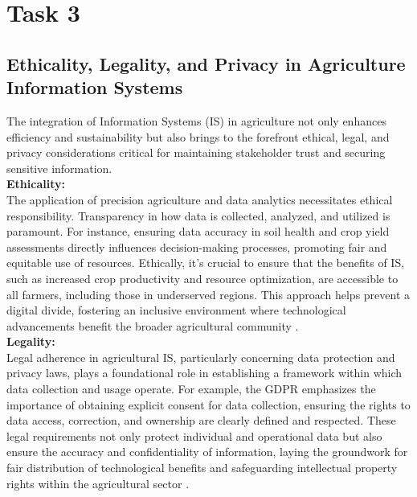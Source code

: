 \documentclass[12pt,a4paper]{article}
\begin{document}
\pagebreak

\setcounter{page}{5}

\section{Task 3}
\subsection{Ethicality, Legality, and Privacy in Agriculture Information Systems}
\label{sec:Task 3}
\nocite{question_3.A}

\noindent The integration of Information Systems (IS) in agriculture not only enhances efficiency and sustainability but also brings to the forefront ethical, legal, and privacy considerations critical for maintaining stakeholder trust and securing sensitive information.\\


\noindent \textbf{Ethicality:} \\The application of precision agriculture and data analytics necessitates ethical responsibility. Transparency in how data is collected, analyzed, and utilized is paramount. For instance, ensuring data accuracy in soil health and crop yield assessments directly influences decision-making processes, promoting fair and equitable use of resources. Ethically, it's crucial to ensure that the benefits of IS, such as increased crop productivity and resource optimization, are accessible to all farmers, including those in underserved regions. This approach helps prevent a digital divide, fostering an inclusive environment where technological advancements benefit the broader agricultural community \citep{Ref_7}.\\


\noindent \textbf{Legality:} \\Legal adherence in agricultural IS, particularly concerning data protection and privacy laws, plays a foundational role in establishing a framework within which data collection and usage operate. For example, the GDPR emphasizes the importance of obtaining explicit consent for data collection, ensuring the rights to data access, correction, and ownership are clearly defined and respected. These legal requirements not only protect individual and operational data but also ensure the accuracy and confidentiality of information, laying the groundwork for fair distribution of technological benefits and safeguarding intellectual property rights within the agricultural sector \citep{Ref_7}.\\
\end{document}
